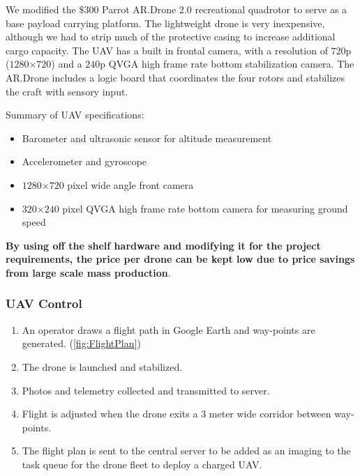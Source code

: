 We modified the $\$300$ Parrot AR.Drone 2.0 recreational quadrotor to serve as a base payload carrying platform. The lightweight drone is very inexpensive, although we had to strip much of the protective casing to increase additional cargo capacity. The UAV has a built in frontal camera, with a resolution of $720$p ($1280$×$720$) and a $240$p QVGA high frame rate bottom stabilization camera. The AR.Drone includes a logic board that coordinates the four rotors and stabilizes the craft with sensory input.

Summary of UAV specifications\cite{ardrone2:specs}:
\begin{onehalfspacing}
	\begin{itemize}
		\item Barometer and ultrasonic sensor for altitude measurement
		\item Accelerometer and gyroscope
		\item $1280$×$720$ pixel wide angle front camera
		\item $320$×$240$ pixel QVGA high frame rate bottom camera for measuring ground speed
	\end{itemize}
\end{onehalfspacing}


\textbf{By using off the shelf hardware and modifying it for the project requirements, the price per drone can be kept low due to price savings from large scale mass production}.

\subsubsection{UAV Control}

\begin{onehalfspacing}
	\begin{enumerate}
		\item An operator draws a flight path in Google Earth and way-points are generated. (\autoref{fig:FlightPlan})
		\item The drone is launched and stabilized.
		\item Photos and telemetry collected and transmitted to server.
		\item Flight is adjusted when the drone exits a 3 meter wide corridor between way-points.
		\item The flight plan is sent to the central server to be added as an imaging to the task queue for the drone fleet to deploy a charged UAV.
	\end{enumerate}
\end{onehalfspacing}

